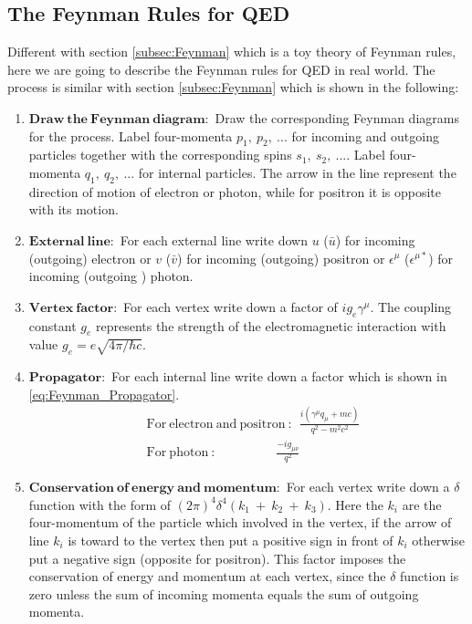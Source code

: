 \subsection{The Feynman Rules for QED}\label{subsec:Feynman_QED}
Different with section \ref{subsec:Feynman} which is a toy theory of Feynman rules, here we are going to describe the Feynman rules for QED in real world. The process is similar with section \ref{subsec:Feynman} which is shown in the following:
\begin{enumerate}
\item $\mathbf{Draw~the~Feynman~diagram:}$ Draw the corresponding Feynman diagrams for the process. Label four-momenta $p_{1},~p_{2},~...$ for incoming and outgoing particles together with the corresponding spins $s_{1},~s_{2},~...$. Label four-momenta $q_{1},~q_{2},~...$ for internal particles. The arrow in the line represent the direction of motion of electron or photon, while for positron it is opposite with its motion.
\item $\mathbf{External~line:}$ For each external line write down $u$ ($\bar{u}$) for incoming (outgoing) electron or $v$ ($\bar{v}$) for incoming (outgoing) positron or  $\epsilon^{\mu}$ ($\epsilon^{\mu\ast}$) for incoming (outgoing ) photon.
\item $\mathbf{Vertex~factor:}$ For each vertex write down a factor of $ig_{e}\gamma^{\mu}$. The coupling constant $g_{e}$ represents the strength of the electromagnetic interaction with value $g_{e}=e\sqrt{4\pi/\hbar c}$.
\item $\mathbf{Propagator:}$ For each internal line write down a factor which is shown in \ref{eq:Feynman_Propagator}.
\begin{equation}
\begin{split}
&\mathrm{For~electron~and~positron~:}~~\frac{i(\gamma^{\mu}q_{\mu}+mc)}{q^{2}-m^{2}c^{2}} \\
&\mathrm{For~photon~:}~~~~~~~~~~~~~~~~~~~~~\frac{-ig_{\mu\nu}}{q^{2}}
\end{split}
\label{eq:Feynman_Propagator}
\end{equation}
\item $\mathbf{Conservation~of~energy~and~momentum:}$ For each vertex write down a $\delta$ function with the form of $(2\pi)^{4}\delta^{4}(k_{1}~+~k_{2}~+~k_{3})$. Here the $k_{i}$ are the four-momentum of the particle which involved in the vertex, if the arrow of line $k_{i}$ is toward to the vertex then put a positive sign in front of $k_{i}$ otherwise put a negative sign (opposite for positron). This factor imposes the conservation of energy and momentum at each vertex, since the $\delta$ function is zero unless the sum of incoming momenta equals the sum of outgoing momenta.

\end{enumerate}

